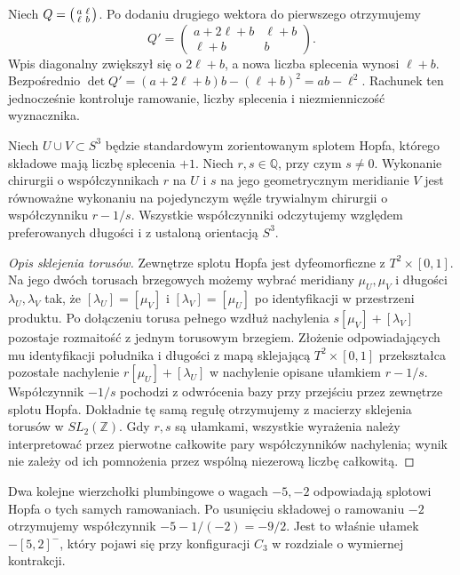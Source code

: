 \begin{przyklad}
Niech $Q=\begin{psmallmatrix}a&\ell\\\ell&b\end{psmallmatrix}$.
Po dodaniu drugiego wektora do pierwszego otrzymujemy
\[
Q'=\begin{pmatrix}a+2\ell+b&\ell+b\\\ell+b&b\end{pmatrix}.
\]
Wpis diagonalny zwiększył się o $2\ell+b$,
a nowa liczba splecenia wynosi $\ell+b$.
Bezpośrednio
$\det Q'=(a+2\ell+b)b-(\ell+b)^2=ab-\ell^2$.
Rachunek ten jednocześnie kontroluje ramowanie,
liczby splecenia i niezmienniczość wyznacznika.
\end{przyklad}

\begin{lemat}
\label{lem:tg-kirby-slam-dunk}
Niech $U\cup V\subset S^3$ będzie standardowym zorientowanym
splotem Hopfa, którego składowe mają liczbę splecenia $+1$.
Niech $r,s\in\mathbb Q$, przy czym $s\ne0$.
Wykonanie chirurgii o współczynnikach $r$ na $U$
i $s$ na jego geometrycznym meridianie $V$ jest
równoważne wykonaniu na pojedynczym węźle trywialnym
chirurgii o współczynniku $r-1/s$. Wszystkie
współczynniki odczytujemy względem preferowanych
długości i z ustaloną orientacją $S^3$.
\end{lemat}
\begin{proof}[Opis sklejenia torusów]
Zewnętrze splotu Hopfa jest dyfeomorficzne
z $T^2\times[0,1]$. Na jego dwóch torusach brzegowych
możemy wybrać meridiany $\mu_U,\mu_V$ i długości
$\lambda_U,\lambda_V$ tak, że
$[\lambda_U]=[\mu_V]$ i $[\lambda_V]=[\mu_U]$
po identyfikacji w przestrzeni produktu.
Po dołączeniu torusa pełnego wzdłuż nachylenia
$s[\mu_V]+[\lambda_V]$ pozostaje rozmaitość
z jednym torusowym brzegiem. Złożenie odpowiadających
mu identyfikacji południka i długości z mapą sklejającą
$T^2\times[0,1]$ przekształca pozostałe nachylenie
$r[\mu_U]+[\lambda_U]$ w nachylenie opisane
ułamkiem $r-1/s$. Współczynnik $-1/s$ pochodzi
z odwrócenia bazy przy przejściu przez zewnętrze
splotu Hopfa. Dokładnie tę samą regułę otrzymujemy
z macierzy sklejenia torusów w $SL_2(\mathbb Z)$.
Gdy $r,s$ są ułamkami, wszystkie wyrażenia należy
interpretować przez pierwotne całkowite pary
współczynników nachylenia; wynik nie zależy od ich
pomnożenia przez wspólną niezerową liczbę całkowitą.
\end{proof}

\begin{przyklad}
Dwa kolejne wierzchołki plumbingowe o wagach
$-5,-2$ odpowiadają splotowi Hopfa o tych samych
ramowaniach. Po usunięciu składowej o ramowaniu
$-2$ otrzymujemy współczynnik
$-5-1/(-2)=-9/2$. Jest to właśnie ułamek
$-[5,2]^-$, który pojawi się przy konfiguracji
$C_3$ w rozdziale o wymiernej kontrakcji.
\end{przyklad}

